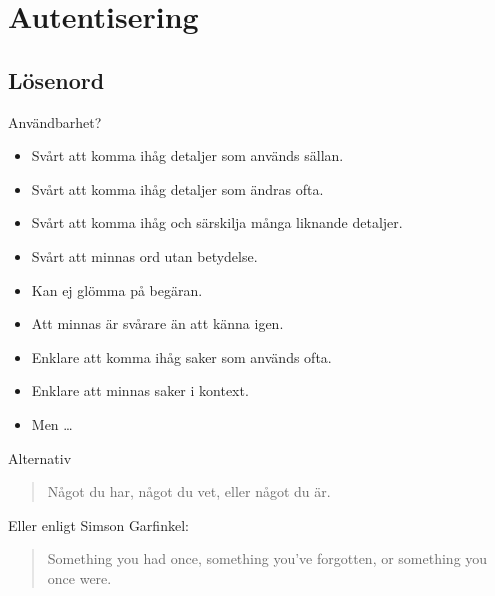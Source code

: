 \documentclass{beamer}
\begin{document}
\section{Autentisering}

\subsection{Lösenord}

\begin{frame}{\insertsubsectionhead}{Användbarhet?}
  \begin{itemize}
    \item Svårt att komma ihåg detaljer som används sällan.
    \item Svårt att komma ihåg detaljer som ändras ofta.
    \item Svårt att komma ihåg och särskilja många liknande detaljer.
    \item Svårt att minnas ord utan betydelse.
    \item Kan ej glömma på begäran.
    \item Att minnas är svårare än att känna igen.
  \end{itemize}
\end{frame}

\begin{frame}{\insertsubsectionhead}
  \begin{itemize}
    \item Enklare att komma ihåg saker som används ofta.
    \item Enklare att minnas saker i kontext.
    \item Men \dots
  \end{itemize}
\end{frame}


\begin{frame}{\insertsubsectionhead}{Alternativ}
  \begin{quote}
    Något du har, något du vet, eller något du är.
  \end{quote}
  Eller enligt Simson Garfinkel:
  \begin{quote}
    Something you had once, something you've forgotten, or something you once 
    were.
  \end{quote}
\end{frame}
\end{document}
